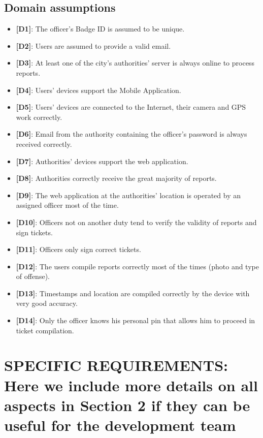 \documentclass[12pt,a4paper]{article}
\begin{document}
\subsection{Domain assumptions} 
\begin{itemize}
\item {\textbf[}\textbf{D1}{\textbf]}: The officer's Badge ID is assumed to be unique.
\item {\textbf[}\textbf{D2}{\textbf]}: Users are assumed to provide a valid email.
\item {\textbf[}\textbf{D3}{\textbf]}: At least one of the city's authorities' server is always online to process reports.
\item {\textbf[}\textbf{D4}{\textbf]}: Users' devices support the Mobile Application.
\item {\textbf[}\textbf{D5}{\textbf]}: Users' devices are connected to the Internet, their camera and GPS work correctly.
\item {\textbf[}\textbf{D6}{\textbf]}: Email from the authority containing the officer's password is always received correctly.
\item {\textbf[}\textbf{D7}{\textbf]}: Authorities' devices support the web application.
\item {\textbf[}\textbf{D8}{\textbf]}: Authorities correctly receive the great majority of reports.
\item {\textbf[}\textbf{D9}{\textbf]}: The web application at the authorities' location is operated by an assigned officer most of the time.
\item {\textbf[}\textbf{D10}{\textbf]}: Officers not on another duty tend to verify the validity of reports and sign tickets.
\item {\textbf[}\textbf{D11}{\textbf]}: Officers only sign correct tickets.
\item {\textbf[}\textbf{D12}{\textbf]}: The users compile reports correctly most of the times (photo and type of offense).
\item {\textbf[}\textbf{D13}{\textbf]}: Timestamps and location are compiled correctly by the device with very good accuracy.
\item {\textbf[}\textbf{D14}{\textbf]}: Only the officer knows his personal pin that allows him to proceed in ticket compilation.
\end{itemize}
\section{SPECIFIC	REQUIREMENTS: Here	we	include	more	details	on	all	aspects	in	Section	2	if	they	
can	be	useful	for	the	development	team}
\end{document}
